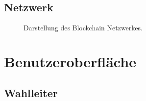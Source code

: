 \documentclass[parskip=full,11pt,twoside]{scrartcl}
\begin{document}
\subsection{Netzwerk}
\begin{figure}[H]
	\caption{\label{fig:network}
		Darstellung des Blockchain Netzwerkes.
	}
\end{figure}

\section{Benutzeroberfläche}

\subsection{Wahlleiter}
\end{document}

